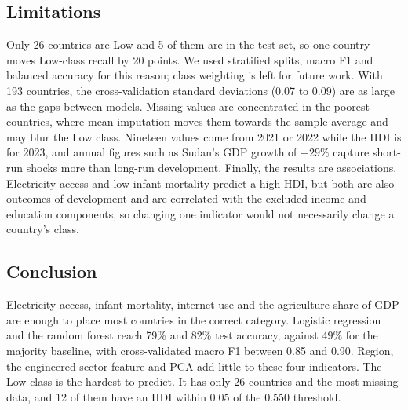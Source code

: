 \documentclass[10pt,a4paper]{article}
\begin{document}
\subsection{Limitations}
Only 26 countries are Low and 5 of them are in the test set, so one country moves Low-class recall by 20 points. We
used stratified splits, macro F1 and balanced accuracy for this reason; class weighting is left for future work.
With 193 countries, the cross-validation standard deviations (0.07 to 0.09) are as large as the gaps between
models. Missing values are concentrated in the poorest countries, where mean imputation moves them towards the
sample average and may blur the Low class. Nineteen values come from 2021 or 2022 while the HDI is for 2023, and
annual figures such as Sudan's GDP growth of $-29\%$ capture short-run shocks more than long-run development.
Finally, the results are associations. Electricity access and low infant mortality predict a high HDI, but both
are also outcomes of development and are correlated with the excluded income and education components, so
changing one indicator would not necessarily change a country's class.

\subsection{Conclusion}
Electricity access, infant mortality, internet use and the agriculture share of GDP are enough to place most
countries in the correct category. Logistic regression and the random forest reach 79\% and 82\% test accuracy,
against 49\% for the majority baseline, with cross-validated macro F1 between 0.85 and 0.90. Region, the engineered
sector feature and PCA add little to these four indicators. The Low class is the hardest to predict. It has only 26
countries and the most missing data, and 12 of them have an HDI within 0.05 of the 0.550 threshold.
\end{document}
